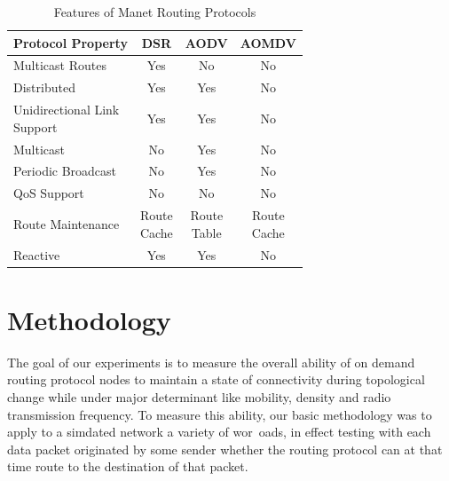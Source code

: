 \documentclass[letterpaper, 10 pt, conference]{ieeeconf}  %
\begin{document}
\begin{table}[hbt!]
\caption{Features of Manet Routing Protocols}

\centering
\begin{tabular}{|l|c|c|c|}
\hline
\textbf{Protocol Property} & \textbf{DSR} & \textbf{AODV} & \textbf{AOMDV} \\ \hline
Multicast Routes & Yes & No & No \\ \hline
Distributed & Yes & Yes & No \\ \hline
\makecell[l]{Unidirectional Link \\ Support} & Yes & Yes & No \\ \hline
Multicast & No  & Yes & No \\ \hline
Periodic Broadcast & No & Yes & No \\ \hline
QoS Support & No & No & No \\ \hline
Route Maintenance & \makecell{Route \\ Cache} & \makecell{Route \\ Table} & \makecell{Route \\ Cache} \\ \hline
Reactive & Yes  & Yes & No \\ \hline
\end{tabular}
\label{table:1}
\end{table}









\section{Methodology}
The goal of our experiments is to measure the overall ability of on demand routing protocol nodes to maintain a state of connectivity during topological change while under major determinant like mobility, density and radio transmission frequency.  To measure this ability, our basic methodology was to apply to a
simdated network a variety of wor~oads, in effect testing with each
data packet originated by some sender whether the routing protocol
can at that time route to the destination of that packet. 
\end{document}
